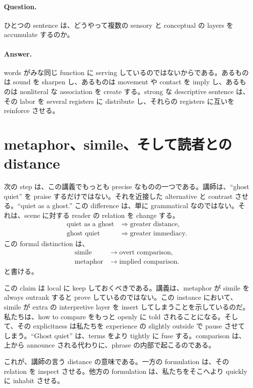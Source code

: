 \paragraph{Question.} ひとつの sentence は、どうやって複数の sensory と conceptual の layers を accumulate するのか。

\paragraph{Answer.} words がみな同じ function に serving しているのではないからである。あるものは sound を sharpen し、あるものは movement や contact を imply し、あるものは nonliteral な association を create する。strong な descriptive sentence は、その labor を several registers に distribute し、それらの registers に互いを reinforce させる。

\section{metaphor、simile、そして読者との distance}

次の step は、この講義でもっとも precise なものの一つである。講師は、``ghost quiet'' を praise するだけではない。それを近接した alternative と contrast させる。``quiet as a ghost.'' この difference は、単に grammatical なのではない。それは、scene に対する reader の relation を change する。
\begin{align}
\text{quiet as a ghost} &\Rightarrow \text{greater distance},\\
\text{ghost quiet} &\Rightarrow \text{greater immediacy}.
\end{align}
この formal distinction は、
\begin{align}
\text{simile} &\to \text{overt comparison},\\
\text{metaphor} &\to \text{implied comparison}.
\end{align}
と書ける。

この claim は local に keep しておくべきである。講義は、metaphor が simile を always outrank すると prove しているのではない。この instance において、simile が extra の interpretive layer を insert してしまうことを示しているのだ。私たちは、how to compare をもっと openly に told されることになる。そして、その explicitness は私たちを experience の slightly outside で pause させてしまう。``Ghost quiet'' は、terms をより tightly に fuse する。comparison は、上から announce される代わりに、phrase の内部で起こるのである。

これが、講師の言う distance の意味である。一方の formulation は、その relation を inspect させる。他方の formulation は、私たちをそこへより quickly に inhabit させる。

